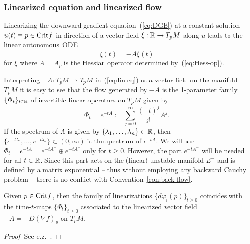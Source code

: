 \documentclass{article}
\begin{document}
\subsubsection*{Linearized equation and linearized flow}%
Linearizing the downward gradient equation~(\ref{eq:DGE})
at a constant solution $u(t)\equiv p\in {\rm Crit} f$ in direction
of a vector field $\xi:{\mathbb{R}}\to T_pM$ along $u$ leads to the linear autonomous~ODE
\begin{equation}\label{eq:lin-eq}
     \dot\xi(t)=-A\xi(t)
\end{equation}
for $\xi$ where $A=A_p$ is the Hessian operator determined by~(\ref{eq:Hess-op}).
 
Interpreting $-A:T_p M\to T_pM$ in~(\ref{eq:lin-eq})
as a vector field on the manifold $T_pM$
it is easy to see that the flow generated by $-A$
is the 1-parameter family $\{\Phi_t\}_{t\in{\mathbb{R}}}$
of invertible linear operators on $T_pM$ given by
\begin{equation}\label{eq:e^tA}
     \Phi_t =e^{-tA}:=\sum_{j=0}^\infty\frac{(-t)^j}{j!}A^j.
\end{equation}
If the spectrum of $A$ is given by $\{\lambda_1,
\dots,\lambda_n\}\subset{\mathbb{R}}$, then $\{e^{-t\lambda_1},
\dots,e^{-t\lambda_n}\}\subset(0,\infty)$ is the
spectrum of $e^{-tA}$.
We will use $\Phi_t=e^{-tA}=e^{-tA^-}\oplus e^{-tA^+}$ only for
$t\ge 0$. However, the part $e^{-tA^-}$ will be needed for all
$t\in{\mathbb{R}}$. Since this part acts on the (linear) unstable manifold $E^-$
and is defined by a matrix exponential -- thus without
employing any backward Cauchy problem --
there is no conflict with Convention~\ref{con:back-flow}.

\begin{lemma}%
Given $p\in{\rm Crit} f$, then the family of linearizations $\{d\varphi_t(p)\}_{t\ge 0}$
coincides with the time-$t$-maps $\{\Phi_t\}_{t\ge 0}$ associated to the linearized
vector field $-A=-D(\nabla f)_p$ on $T_pM$.
\end{lemma}

\begin{proof}
See e.g.~\cite[Le.~2.5]{weber:2006b}.
\end{proof}
\end{document}
